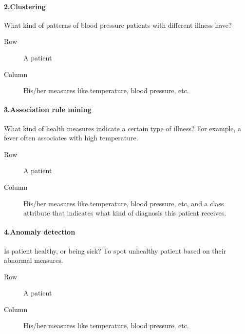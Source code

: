 \documentclass[paper=a4, fontsize=11pt]{scrartcl} %
\begin{document}
\paragraph{2.Clustering} What kind of patterns of blood pressure patients with different illness have?
\begin{description}
\item[Row] A patient
\item[Column] His/her measures like temperature, blood pressure, etc.
\end{description}

\paragraph{3.Association rule mining} What kind of health measures indicate a certain type of illness? For example, a fever often associates with high temperature.
\begin{description}
\item[Row] A patient
\item[Column] His/her measures like temperature, blood pressure, etc, and a class attribute that indicates what kind of diagnosis this patient receives.
\end{description}

\paragraph{4.Anomaly detection} Is patient healthy, or being sick? To spot unhealthy patient based on their abnormal measures.
\begin{description}
\item[Row] A patient
\item[Column] His/her measures like temperature, blood pressure, etc.
\end{description}
\end{document}
